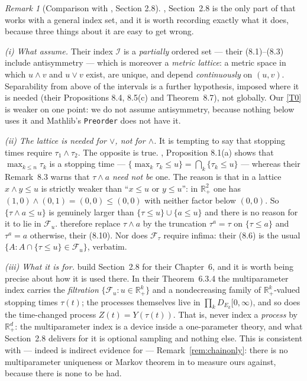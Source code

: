 \documentclass[11pt,a4paper]{article}
\theoremstyle{plain}
\theoremstyle{definition}
\theoremstyle{remark}
\newtheorem{remark}[theorem]{Remark}
\newcommand{\R}{\mathbb{R}}
\newcommand{\Rp}{\R_+}
\newcommand{\Filt}{\mathcal{F}}
\newcommand{\EK}{\cite{EK86}}
\begin{document}
\begin{remark}[Comparison with \EK, Section 2.8]
  \label{rem:ekindex}
  \EK, Section~2.8 is the only part of \EK{} that works with a general index set,
  and it is worth recording exactly what it does, because three things about it
  are easy to get wrong.

  \emph{(i) What \EK{} assume.}  Their index $\mathscr{I}$ is a
  \emph{partially} ordered set --- their (8.1)--(8.3) include antisymmetry ---
  which is moreover a \emph{metric lattice}: a metric space in which $u \wedge v$
  and $u \vee v$ exist, are unique, and depend \emph{continuously} on $(u,v)$.
  Separability from above of the intervals is a further hypothesis, imposed where
  it is needed (their Propositions 8.4, 8.5(c) and Theorem~8.7), not globally.
  Our \eqref{T0} is weaker on one point: we do not assume antisymmetry, because nothing
  below uses it and Mathlib's \texttt{Preorder} does not have it.

  \emph{(ii) The lattice is needed for $\vee$, not for $\wedge$.}  It is tempting
  to say that stopping times require $\tau_1 \wedge \tau_2$.  The opposite is
  true.  \EK, Proposition 8.1(a) shows that $\max_{k \leq n} \tau_k$ is a stopping
  time --- $\{\max_k \tau_k \leq u\} = \bigcap_k \{\tau_k \leq u\}$ --- whereas
  their Remark~8.3 warns that $\tau \wedge a$ \emph{need not be} one.  The reason
  is that in a lattice $x \wedge y \leq u$ is strictly weaker than
  ``$x \leq u$ or $y \leq u$'': in $\Rp^2$ one has
  $(1,0) \wedge (0,1) = (0,0) \leq (0,0)$ with neither factor below $(0,0)$.  So
  $\{\tau \wedge a \leq u\}$ is genuinely larger than
  $\{\tau \leq u\} \cup \{a \leq u\}$ and there is no reason for it to lie in
  $\Filt_u$.  \EK{} therefore replace $\tau \wedge a$ by the truncation
  $\tau^a = \tau$ on $\{\tau \leq a\}$ and $\tau^a = a$ otherwise, their (8.10).
  Nor does $\Filt_\tau$ require infima: their (8.6) is the usual
  $\{A : A \cap \{\tau \leq u\} \in \Filt_u\}$, verbatim.

  \emph{(iii) What it is for.}  \EK{} build Section~2.8 for their Chapter~6, and
  it is worth being precise about how it is used there.  In their
  Theorem~6.3.4 the multiparameter index carries the \emph{filtration}
  $\{\Filt_u : u \in \Rp^k\}$ and a nondecreasing family of $\Rp^k$-valued
  stopping times $\tau(t)$; the processes themselves live in
  $\prod_k D_{E_k}[0,\infty)$, and so does the time-changed process
  $Z(t) = Y(\tau(t))$.  That is, \EK{} never index a \emph{process} by $\Rp^d$:
  the multiparameter index is a device inside a one-parameter theory, and what
  Section~2.8 delivers for it is optional sampling and nothing else.  This is
  consistent with --- indeed is indirect evidence for ---
  Remark~\ref{rem:chainonly}: there is no multiparameter uniqueness or Markov
  theorem in \EK{} to measure ours against, because there is none to be had.


\end{remark}
\end{document}
